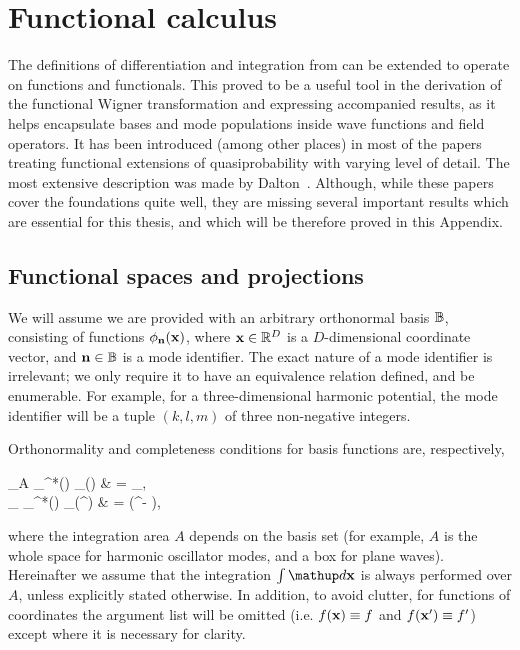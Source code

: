 \chapter{Functional calculus}
\label{cha:appendix:func-calculus}

The definitions of differentiation and integration from  can be extended to operate on functions and functionals.
This proved to be a useful tool in the derivation of the functional Wigner transformation and expressing accompanied results, as it helps encapsulate bases and mode populations inside wave functions and field operators.
It has been introduced (among other places) in most of the papers treating functional extensions of quasiprobability with varying level of detail.
The most extensive description was made by Dalton~\cite{Dalton2012}.
Although, while these papers cover the foundations quite well, they are missing several important results which are essential for this thesis, and which will be therefore proved in this Appendix.


\section{Functional spaces and projections}

We will assume we are provided with an arbitrary orthonormal basis $\mathbb{B}$, consisting of functions $\phi_{\mathbf{n}}(\mathbf{x})$, where $\mathbf{x} \in \mathbb{R}^D$ is a $D$-dimensional coordinate vector, and $\mathbf{n} \in \mathbb{B}$ is a mode identifier.
The exact nature of a mode identifier is irrelevant; we only require it to have an equivalence relation defined, and be enumerable.
For example, for a three-dimensional harmonic potential, the mode identifier will be a tuple $(k,l,m)$ of three non-negative integers.

Orthonormality and completeness conditions for basis functions are, respectively,
\begin{eqns}
\label{eqn:func-calculus:basis}
	\int\limits_A \phi_{\nvec}^*(\xvec) \phi_{\mvec}(\xvec) \upd\xvec
	& = \delta_{\nvec\mvec}, \\
	\sum_{\nvec \in \fullbasis} \phi_{\nvec}^*(\xvec) \phi_{\nvec}(\xvec^\prime)
	& = \delta(\xvec^\prime - \xvec),
\end{eqns}
where the integration area $A$ depends on the basis set (for example, $A$ is the whole space for harmonic oscillator modes, and a box for plane waves).
Hereinafter we assume that the integration $\int \upd\xvec$ is always performed over $A$, unless explicitly stated otherwise. In addition, to avoid clutter, for functions of coordinates the argument list will be omitted (i.e. $f(\mathbf{x}) \equiv f$ and $f(\mathbf{x}^\prime) \equiv f^\prime$) except where it is necessary for clarity.

